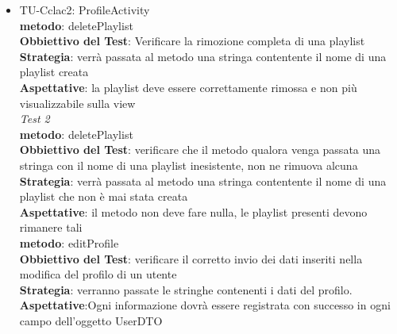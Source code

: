 \begin{itemize}
\textbf{metodo}: addSong\\
\textbf{Obbiettivo del Test}: verificare la corretta registrazione di una nuova
canzone sul DB\\
\textbf{Strategia}: viene passato un oggetto Song al metodo che si occupa di
registrarne i campi, e una variabile booleana update per l'aggiornamento delle
statistiche dell'utente\\
\textbf{Aspettative}: il metodo deve ricercare nel DB
la presenza della canzone che si sta cercando di aggiungere. In caso di match positivo, la canzone non viene aggiunta perch\`e gi\`a presente, in caso negativo viene registrata e i
campi corretti relativi alle informazioni della libreria vengono aggiornati\\

---------nuovi TU\\

\item TU-Cclac2:  ProfileActivity\\
\textbf{metodo}: deletePlaylist\\
\textbf{Obbiettivo del Test}: Verificare la rimozione completa di una playlist\\
\textbf{Strategia}: verr\`a passata al metodo una stringa contentente il nome
di una playlist creata\\ 
\textbf{Aspettative}: la playlist deve essere correttamente rimossa e non
pi\`u visualizzabile sulla view\\

\emph{Test 2}\\
\textbf{metodo}: deletePlaylist\\
\textbf{Obbiettivo del Test}: verificare che il metodo qualora venga passata
una stringa con il nome di una playlist inesistente, non ne rimuova alcuna\\
\textbf{Strategia}: verr\`a passata al metodo una stringa contentente il nome di
una playlist che non \`e mai stata creata\\ 
\textbf{Aspettative}: il metodo non deve fare nulla, le playlist presenti
devono rimanere tali\\

\textbf{metodo}: editProfile\\
\textbf{Obbiettivo del Test}: verificare il corretto invio dei dati inseriti
nella modifica del profilo di un utente\\
\textbf{Strategia}: verranno passate le stringhe contenenti i dati del profilo.
\\
\textbf{Aspettative}:Ogni informazione dovr\`a essere registrata con successo in ogni campo
dell'oggetto UserDTO
\\


\end{itemize}
